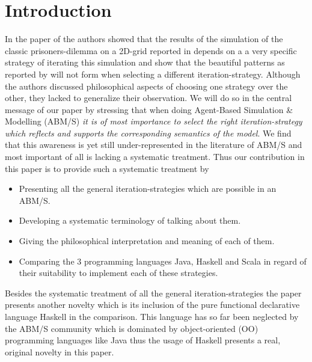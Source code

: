 \section{Introduction}
In the paper of \cite{huberman_evolutionary_1993} the authors showed that the results of the simulation of the classic prisoners-dilemma on a 2D-grid reported in \cite{nowak_evolutionary_1992} depends on a a very specific strategy of iterating this simulation and show that the beautiful patterns as reported by \cite{nowak_evolutionary_1992} will not form when selecting a different iteration-strategy. Although the authors discussed philosophical aspects of choosing one strategy over the other, they lacked to generalize their observation. We will do so in the central message of our paper by stressing that when doing Agent-Based Simulation \& Modelling (ABM/S) \textit{it is of most importance to select the right iteration-strategy which reflects and supports the corresponding semantics of the model}. We find that this awareness is yet still under-represented in the literature of ABM/S and most important of all is lacking a systematic treatment. Thus our contribution in this paper is to provide such a systematic treatment by
\begin{itemize}
	\item Presenting all the general iteration-strategies which are possible in an ABM/S.
	\item Developing a systematic terminology of talking about them.
	\item Giving the philosophical interpretation and meaning of each of them.
	\item Comparing the 3 programming languages Java, Haskell and Scala in regard of their suitability to implement each of these strategies.
\end{itemize}

Besides the systematic treatment of all the general iteration-strategies the paper presents another novelty which is its inclusion of the pure functional declarative language Haskell in the comparison. This language has so far been neglected by the ABM/S community which is dominated by object-oriented (OO) programming languages like Java thus the usage of Haskell presents a real, original novelty in this paper.